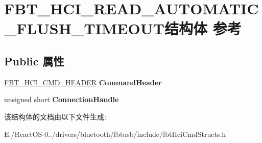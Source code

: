 \hypertarget{struct_f_b_t___h_c_i___r_e_a_d___a_u_t_o_m_a_t_i_c___f_l_u_s_h___t_i_m_e_o_u_t}{}\section{F\+B\+T\+\_\+\+H\+C\+I\+\_\+\+R\+E\+A\+D\+\_\+\+A\+U\+T\+O\+M\+A\+T\+I\+C\+\_\+\+F\+L\+U\+S\+H\+\_\+\+T\+I\+M\+E\+O\+U\+T结构体 参考}
\label{struct_f_b_t___h_c_i___r_e_a_d___a_u_t_o_m_a_t_i_c___f_l_u_s_h___t_i_m_e_o_u_t}
\subsection*{Public 属性}
\begin{DoxyCompactItemize}
\item 
\mbox{\label{struct_f_b_t___h_c_i___r_e_a_d___a_u_t_o_m_a_t_i_c___f_l_u_s_h___t_i_m_e_o_u_t_ac5a8f27fc300cec7620b4df157f1f601}} 
\hyperlink{struct_f_b_t___h_c_i___c_m_d___h_e_a_d_e_r}{F\+B\+T\+\_\+\+H\+C\+I\+\_\+\+C\+M\+D\+\_\+\+H\+E\+A\+D\+ER} {\bfseries Command\+Header}
\item 
\mbox{\label{struct_f_b_t___h_c_i___r_e_a_d___a_u_t_o_m_a_t_i_c___f_l_u_s_h___t_i_m_e_o_u_t_a5ac9ad834102062909995c5da4fc3aea}} 
unsigned short {\bfseries Connection\+Handle}
\end{DoxyCompactItemize}


该结构体的文档由以下文件生成\+:\begin{DoxyCompactItemize}
\item 
E\+:/\+React\+O\+S-\/0../drivers/bluetooth/fbtusb/include/fbt\+Hci\+Cmd\+Structs.\+h\end{DoxyCompactItemize}
